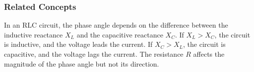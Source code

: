 \subsubsection*{Related Concepts}
In an RLC circuit, the phase angle depends on the difference between the inductive reactance \(X_L\) and the capacitive reactance \(X_C\). If \(X_L > X_C\), the circuit is inductive, and the voltage leads the current. If \(X_C > X_L\), the circuit is capacitive, and the voltage lags the current. The resistance \(R\) affects the magnitude of the phase angle but not its direction.

